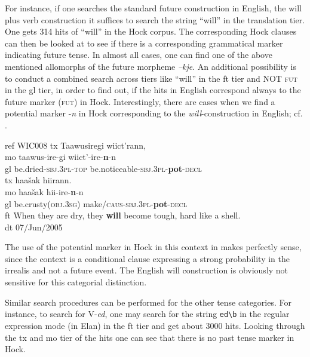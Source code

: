 For instance, if one searches the standard future construction in English, the will plus verb construction it suffices to search the string ``will'' in the translation tier. One gets 314 hits of ``will'' in the Hoc{\A}k corpus. The corresponding Hoc{\A}k clauses can then be looked at to see if there is a corresponding grammatical marker indicating future tense. In almost all cases, one can find one of the above mentioned allomorphs of the future morpheme \textit{--kje}. An additional possibility is to conduct a combined search across tiers like ``will'' in the ft tier and NOT \textsc{fut} in the gl tier, in order to find out, if the hits in English correspond always to the future marker (\textsc{fut}) in Hoc{\A}k. Interestingly, there are cases when we find a potential marker -\textit{n{\A}{\A}} in Hoc{\A}k corresponding to the \textit{will}{}-construction in English; cf. .
 
\newpage
\ea    \label{bouda:ex:WIC008}
ref WIC008
\glll 
tx Taawusiregi wiic{\A}t'{\II}{\II}ran{\A}{\A}n{\A},              \\
mo taawus-ire-gi wiic{\A}t'{\II}-ire-\textbf{n{\A}{\A}}-n{\A}       \\
gl be.dried-\textsc{sbj}.3\textsc{pl}-\textsc{top} be.noticeable-\textsc{sbj}.3\textsc{pl}-\textbf{pot}{}-\textsc{decl}     \\
\glll
tx haa\v{s}ak hiiran{\A}{\A}n{\A}. \\
mo haa\v{s}ak hii-ire-\textbf{n{\A}{\A}}-n{\A} \\
gl be.crusty(\textsc{obj}.3\textsc{sg}) make/\textsc{caus}-\textsc{sbj}.3\textsc{pl}-\textbf{pot}-\textsc{decl}\\

ft When they are dry, they \textbf{will} become tough, hard like a shell.\\
dt 07/Jun/2005
\z


The use of the potential marker in Hoc{\A}k in this context in  makes perfectly sense, since the context is a conditional clause expressing a strong probability in the irrealis and not a future event. The English will construction is obviously not sensitive for this categorial distinction. 

Similar search procedures can be performed for the other tense categories. For instance, to search for V-\textit{ed}, one may search for the string \texttt{ed{\textbackslash}b} in the regular expression mode (in Elan) in the ft tier and get	 about 3000 hits. Looking through the tx and mo tier of the hits one can see that there is no past tense marker in Hoc{\A}k. 

